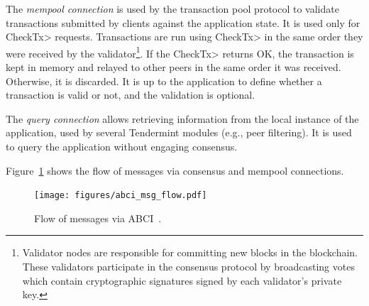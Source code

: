 %

The \textit{mempool connection} is used by the transaction
pool protocol to validate transactions submitted
by clients against the application state. 
%
It is used only for \<CheckTx> requests. Transactions
are run using \<CheckTx> in the same order they were received
by the validator\footnote{Validator nodes are responsible for committing new blocks in the blockchain. These validators participate in the consensus protocol by broadcasting votes which contain cryptographic signatures signed by each validator's private key.}. If the \<CheckTx> returns OK, the transaction
is kept in memory and relayed to other peers in the same order
it was received. Otherwise, it is discarded.
%
It is up to the application to define whether a transaction is valid or not, and
the validation is optional. 

%

The \textit{query connection} allows retrieving information
from the local instance of the application, used by several
Tendermint modules (e.g., peer filtering).
%
It is used to query the application without engaging consensus. 

Figure~\ref{fig:abci_flow} shows the flow of messages via consensus and mempool connections.
%

\begin{figure}
  \centering
  \texttt{[image: figures/abci\_msg\_flow.pdf]}
  \caption{Flow of messages via ABCI~\cite{tendermint.site}.}
  \label{fig:abci_flow}
\end{figure}

